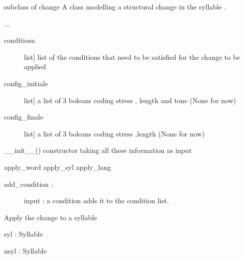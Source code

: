 \documentclass[letterpaper,10pt,english]{sphinxmanual}
\begin{document}
\begin{fulllineitems}
\label{\detokenize{index:Change.S_change}}
\sphinxAtStartPar
subclass of change 
A class modelling a structural change in the syllable .

\sphinxAtStartPar
...
\begin{description}
\item[{conditiosn}] \leavevmode{[}list{]}
\sphinxAtStartPar
list of the conditions that need to be satisfied for the change to be applied

\item[{config\_initiale}] \leavevmode{[}list{]}
\sphinxAtStartPar
a list of 3 boleans coding stress , length and tone (None for now)

\item[{config\_finale}] \leavevmode{[}list{]}
\sphinxAtStartPar
a list of 3 boleans coding stress ,length (None for now)

\end{description}

\sphinxAtStartPar
\_\_init\_\_() constructor taking all these information as input

\sphinxAtStartPar
apply\_word
apply\_syl
apply\_lang
\begin{description}
\item[{add\_condition :}] \leavevmode
\sphinxAtStartPar
input : a condition
adds it to the condition list.

\end{description}

\begin{fulllineitems}
\label{\detokenize{index:Change.S_change.apply_syl}}
\sphinxAtStartPar
Apply the change to a syllable

\sphinxAtStartPar
syl : Syllable

\sphinxAtStartPar
nsyl : Syllable

\end{fulllineitems}



\end{fulllineitems}
\end{document}
